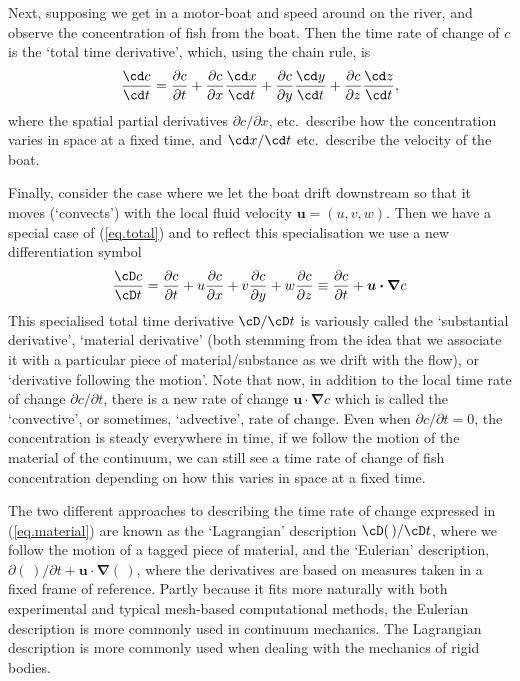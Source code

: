\documentclass[twoside,11pt]		{report}
\begin{document}
Next, supposing we get in a motor-boat and speed around on the river,
and observe the concentration of fish from the boat. Then the time
rate of change of $c$ is the `total time derivative', which, using the
chain rule, is
\begin{equation}
\frac{\cd c}{\cd t} = \frac{\partial c}{\partial t}+
\frac{\partial c}{\partial x}\frac{\cd x}{\cd t}+
\frac{\partial c}{\partial y}\frac{\cd y}{\cd t}+
\frac{\partial c}{\partial z}\frac{\cd z}{\cd t},
\label{eq.total}
\end{equation}
where the spatial partial derivatives $\partial c/\partial x$, etc.\
describe how the concentration varies in space at a fixed time, and
$\cd x/\cd t$ etc.\ describe the velocity of the boat.

Finally, consider the case where we let the boat drift downstream so
that it moves (`convects') with the local fluid velocity $\bm{u} = (u,
v, w)$. Then we have a special case of (\ref{eq.total}) and to reflect
this specialisation we use a new differentiation symbol
\begin{equation}
\frac{\cD c}{\cD t} = \frac{\partial c}{\partial t}+
u\frac{\partial c}{\partial x}+
v\frac{\partial c}{\partial y}+
w\frac{\partial c}{\partial z}\equiv
\frac{\partial c}{\partial t}+\bm{u\cdot\nabla}c
\label{eq.material}
\end{equation}
This specialised total time derivative $\cD/\cD t$ is variously called
the `substantial derivative', `material derivative' (both stemming
from the idea that we associate it with a particular piece of
material/substance as we drift with the flow), or `derivative
following the motion'. Note that now, in addition to the local time
rate of change $\partial c/\partial t$, there is a new rate of change
$\bm{u\cdot\nabla}c$ which is called the `convective', or sometimes,
`advective', rate of change. Even when $\partial c/\partial t=0$, \ie
the concentration is steady everywhere in time, if we follow the
motion of the material of the continuum, we can still see a time rate
of change of fish concentration depending on how this varies in space
at a fixed time.

The two different approaches to describing the time rate of change
expressed in (\ref{eq.material}) are known as the `Lagrangian'
description $\cD(\,)/\cD t$, where we follow the motion of a tagged
piece of material, and the `Eulerian' description,
$\partial(\,)/\partial t+\bm{u\cdot\nabla}(\,)$, where the derivatives
are based on measures taken in a fixed frame of reference. Partly
because it fits more naturally with both experimental and typical
mesh-based computational methods, the Eulerian description is more
commonly used in continuum mechanics. The Lagrangian description is
more commonly used when dealing with the mechanics of rigid bodies.
\end{document}
